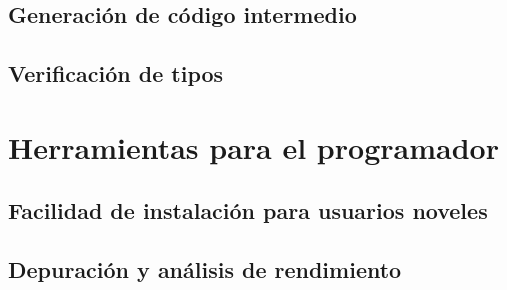 \subsection{Generación de código intermedio}

\subsection{Verificación de tipos}
\blindtext[1]

\section{Herramientas para el programador}
\subsection{Facilidad de instalación para usuarios noveles}
\blindtext[1]

\subsection{Depuración y análisis de rendimiento}
\blindtext[1]
